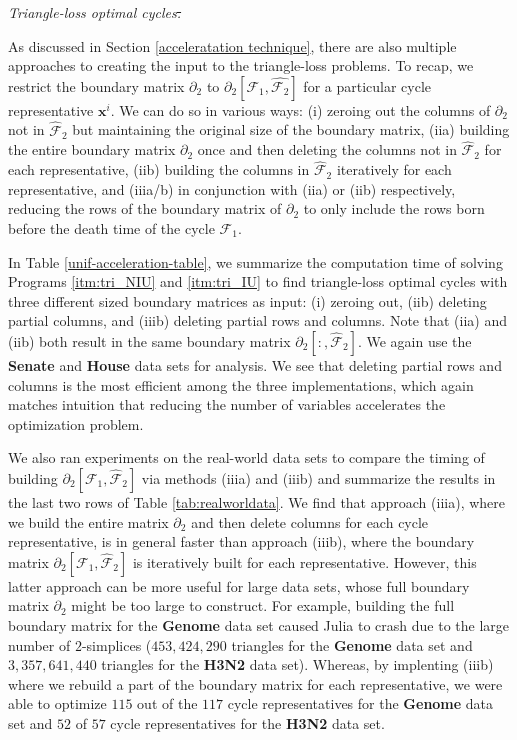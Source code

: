 \documentclass[utf8]{formatting_stuff/frontiersFPHY}
\newcommand{\optimalrep}{\mathbf{x}}
\newcommand{\tab}{Table }
\newcommand{\se}{Section }
\newcommand{\goodvolmatrix}{\partial_{2}[\mathcal{F}_1, \hat {\mathcal{F}_2}]}
\theoremstyle{plain}
\theoremstyle{definition}
\providecommand{\DIFaddtex}[1]{{\protect\color{blue}\uwave{#1}}}
\providecommand{\DIFdeltex}[1]{{\protect\color{red}\sout{#1}}}
\providecommand{\DIFaddbegin}{} %
\providecommand{\DIFaddend}{} %
\providecommand{\DIFdelbegin}{} %
\providecommand{\DIFdelend}{} %
\providecommand{\DIFadd}[1]{\texorpdfstring{\DIFaddtex{#1}}{#1}} %
\providecommand{\DIFdel}[1]{\texorpdfstring{\DIFdeltex{#1}}{}} %
\begin{document}
\DIFaddbegin \noindent \DIFaddend \emph{Triangle-loss optimal cycles\DIFdelbegin \DIFdel{.}\DIFdelend }

As discussed in \se \ref{acceleratation technique}, there are also multiple approaches to creating the input to the triangle-loss problems. To recap, we restrict the boundary matrix $\partial_2$ to $\goodvolmatrix$ for a particular cycle representative $\optimalrep^i$. We can do so in various ways: (i) zeroing out the columns of $\partial_2$ not in $\hat{\mathcal{F}}_2$ but maintaining the original size of the boundary matrix, (iia) building the entire boundary matrix $\partial_2$ once and then deleting the columns not in $\hat{\mathcal{F}}_2$ for each representative, (iib) building the columns in $\hat{\mathcal{F}}_2$ iteratively for each representative, and (iiia/b) in conjunction with (iia) or (iib) respectively, reducing the rows of the boundary matrix of $\partial_2$ to only include the rows born before the death time of the cycle $\mathcal{F}_1$. 

In \tab \ref{unif-acceleration-table}, we summarize the computation time of solving Programs 
\ref{itm:tri_NIU} and
\ref{itm:tri_IU}
 to find triangle-loss optimal cycles with three different sized boundary matrices as input: (i) zeroing out, (iib) deleting partial columns, and (iiib) deleting partial rows and columns. Note that (iia) and (iib) both result in the same boundary matrix $\partial_2[:, \hat{\mathcal{F}}_2]$. We again use the \textbf{Senate} and \textbf{House} data sets for analysis. We see that deleting partial rows and columns is the most efficient among the three implementations, which again matches intuition that reducing the number of variables accelerates the optimization problem. 

We also ran experiments on the real-world data sets to compare the timing of building $\partial_{2}[ \mathcal{F}_1 , \hat {\mathcal{F}}_{2}]$ via methods (iiia) and (iiib) and summarize the results in the last two rows of \tab \ref{tab:realworldata}. We find that approach (iiia), where we build the entire matrix $\partial_2$ and then delete columns for each cycle representative, is in general faster than approach (iiib), where the boundary matrix $\partial_2[\mathcal{F}_1, \hat{\mathcal{F}}_2]$ is iteratively built for each representative. However, this latter approach can be more useful for large data sets, whose full boundary matrix $\partial_2$ might be too large to construct. For example, building the full boundary matrix for the \textbf{Genome} data set caused Julia to crash due to the large number  of $2$-simplices (\DIFdelbegin \DIFdel{$453,424,290$ }\DIFdelend \DIFaddbegin \DIFadd{$453{,}424{,}290$ }\DIFaddend triangles for the \textbf{Genome} data set and \DIFdelbegin \DIFdel{$3,357,641,440$ }\DIFdelend \DIFaddbegin \DIFadd{$3{,}357{,}641{,}440$ }\DIFaddend triangles for the \textbf{H3N2} data set). Whereas, by implenting (iiib) where we rebuild a part of the boundary matrix for each representative, we were able to optimize $115$ out of the $117$ cycle representatives for the \textbf{Genome} data set and $52$ of $57$ cycle representatives for the \textbf{H3N2} data set.
\end{document}
